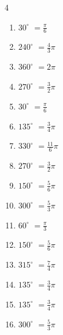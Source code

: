 \begin{multicols}{4}
\begin{enumerate}
  \item $\displaystyle 30^{\circ}$
        $\displaystyle =\frac{\pi}{6}$

\columnbreak %

\resetques

  \item $\displaystyle 240^{\circ}$
        $\displaystyle =\frac{4}{3}\pi$

  \item $\displaystyle 360^{\circ}$
        $\displaystyle =2\pi$

  \item $\displaystyle 270^{\circ}$
        $\displaystyle =\frac{3}{2}\pi$

  \item $\displaystyle 30^{\circ}$
        $\displaystyle =\frac{\pi}{6}$

  \item $\displaystyle 135^{\circ}$
        $\displaystyle =\frac{3}{4}\pi$

  \item $\displaystyle 330^{\circ}$
        $\displaystyle =\frac{11}{6}\pi$

  \item $\displaystyle 270^{\circ}$
        $\displaystyle =\frac{3}{2}\pi$

  \item $\displaystyle 150^{\circ}$
        $\displaystyle =\frac{5}{6}\pi$

  \item $\displaystyle 300^{\circ}$
        $\displaystyle =\frac{5}{3}\pi$

  \item $\displaystyle 60^{\circ}$
        $\displaystyle =\frac{\pi}{3}$

  \item $\displaystyle 150^{\circ}$
        $\displaystyle =\frac{5}{6}\pi$

  \item $\displaystyle 315^{\circ}$
        $\displaystyle =\frac{7}{4}\pi$

  \item $\displaystyle 135^{\circ}$
        $\displaystyle =\frac{3}{4}\pi$

  \item $\displaystyle 135^{\circ}$
        $\displaystyle =\frac{3}{4}\pi$

  \item $\displaystyle 300^{\circ}$
        $\displaystyle =\frac{5}{3}\pi$


\end{enumerate}
\end{multicols}
